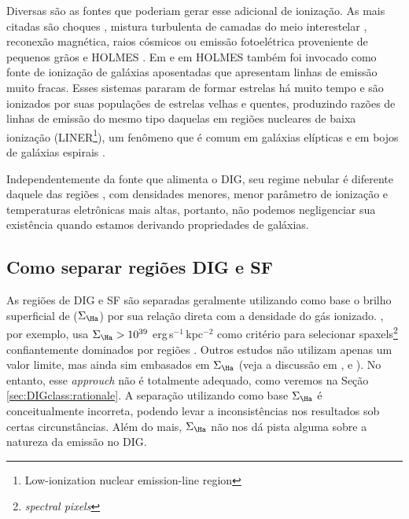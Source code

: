 Diversas são as fontes que poderiam gerar esse adicional de ionização. As mais citadas são choques \citep{CollinsRand.2001}, mistura turbulenta de camadas do meio interestelar \citep{SlavinShullBegelman.1993, Binette.etal.2009a}, reconexão magnética, raios cósmicos ou emissão fotoelétrica proveniente de pequenos grãos \citep{Reynolds.etal.2001} e HOLMES \citep{FloresFajardo.etal.2011a}. Em \citet{Stasinska.etal.2008a} e em \citet[][daqui por diante CF11]{CidFernandes.etal.2011a}  HOLMES também foi invocado como fonte de ionização de galáxias aposentadas que apresentam linhas de emissão muito fracas. Esses sistemas pararam de formar estrelas há muito tempo e são ionizados por suas populações de estrelas velhas e quentes, produzindo razões de linhas de emissão do mesmo tipo daquelas em regiões nucleares de baixa ionização (LINER\footnote{Low-ionization nuclear emission-line region}), um fenômeno que é comum em galáxias elípticas e em bojos de galáxias espirais \citep{Sarzi.etal.2010, Gomes.etal.2016a, Belfiore.etal.2016}.

Independentemente da fonte que alimenta o DIG, seu regime nebular é diferente daquele das regiões \hii, com densidades menores, menor parâmetro de ionização e temperaturas eletrônicas mais altas, portanto, não podemos negligenciar sua existência quando estamos derivando propriedades de galáxias.

\subsection{Como separar regiões DIG e SF}
\label{sec:intro:DIG:class}
As regiões de DIG e SF são separadas geralmente utilizando como base o brilho superficial de \Ha ($\Sigma_{\Ha}$) por sua relação direta com a densidade do gás ionizado. \citet{Zhang.etal.2017a}, por exemplo, usa $\Sigma_{\Ha} > 10^{39}$ erg$\,$s$^{-1}\,$kpc$^{-2}$ como critério para selecionar spaxels\footnote{\em spectral pixels} confiantemente dominados por regiões \hii. Outros estudos não utilizam apenas um valor limite, mas ainda sim embasados em $\Sigma_{\Ha}$ (veja a discussão em \citealt{Zurita.etal.2000}, \citealt{Oey.etal.2007} e \citealt{Vogt.etal.2017a}). No entanto, esse {\em approuch} não é totalmente adequado, como veremos na Seção \ref{sec:DIGclass:rationale}. A separação utilizando como base $\Sigma_{\Ha}$ é conceitualmente incorreta, podendo levar a inconsistências nos resultados sob certas circunstâncias. Além do mais, $\Sigma_{\Ha}$ não nos dá pista alguma sobre a natureza da emissão no DIG.



